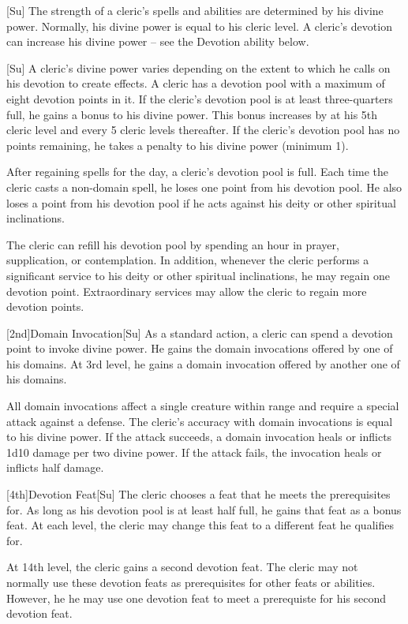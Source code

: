 [Su]
The strength of a cleric's spells and abilities are determined by his divine power.
Normally, his divine power is equal to his cleric level.
A cleric's devotion can increase his divine power -- see the Devotion ability below.

[Su]
A cleric's divine power varies depending on the extent to which he calls on his devotion to create effects.
A cleric has a devotion pool with a maximum of eight devotion points in it.
If the cleric's devotion pool is at least three-quarters full, he gains a  bonus to his divine power.
This bonus increases by  at his 5th cleric level and every 5 cleric levels thereafter.
If the cleric's devotion pool has no points remaining, he takes a  penalty to his divine power (minimum 1).

After regaining spells for the day, a cleric's devotion pool is full.
Each time the cleric casts a non-domain spell, he loses one point from his devotion pool.
He also loses a point from his devotion pool if he acts against his deity or other spiritual inclinations.

The cleric can refill his devotion pool by spending an hour in prayer, supplication, or contemplation.
In addition, whenever the cleric performs a significant service to his deity or other spiritual inclinations, he may regain one devotion point.
Extraordinary services may allow the cleric to regain more devotion points.

[2nd]{Domain Invocation}[Su]
As a standard action, a cleric can spend a devotion point to invoke divine power.
He gains the domain invocations offered by one of his domains.
At 3rd level, he gains a domain invocation offered by another one of his domains.

All domain invocations affect a single creature within \rngmed range and require a special attack against a defense.
The cleric's accuracy with domain invocations is equal to his divine power.
If the attack succeeds, a domain invocation heals or inflicts 1d10 damage per two divine power.
If the attack fails, the invocation heals or inflicts half damage.

[4th]{Devotion Feat}[Su]
The cleric chooses a feat that he meets the prerequisites for.
As long as his devotion pool is at least half full, he gains that feat as a bonus feat.
At each level, the cleric may change this feat to a different feat he qualifies for.

At 14th level, the cleric gains a second devotion feat.
The cleric may not normally use these devotion feats as prerequisites for other feats or abilities.
However, he he may use one devotion feat to meet a prerequiste for his second devotion feat.

